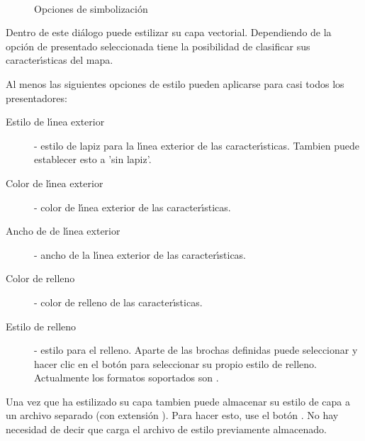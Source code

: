 \begin{figure}[h]
\centering
\caption{Opciones de simbolizaci\'on \nixcaption}
   \goodgap
   \\
   \goodgap
\end{figure}


 \label{sec:style_options} 
Dentro de este di\'alogo puede estilizar su capa vectorial. Dependiendo de la opci\'on de presentado
seleccionada tiene la posibilidad de clasificar sus caracter\'{\i}sticas del mapa.

Al menos las siguientes opciones de estilo pueden aplicarse para casi todos los presentadores:
\begin{description}
 \item[Estilo de l\'{\i}nea exterior] - estilo de lapiz para la l\'{\i}nea exterior de las caracter\'{\i}sticas. Tambien puede establecer
 esto a 'sin lapiz'.
 \item[Color de l\'{\i}nea exterior] - color de l\'{\i}nea exterior de las caracter\'{\i}sticas.
 \item[Ancho de de l\'{\i}nea exterior] - ancho de la l\'{\i}nea exterior de las caracter\'{\i}sticas.
 \item[Color de relleno] - color de relleno de las caracter\'{\i}sticas.
 \item[Estilo de relleno] - estilo para el relleno. Aparte de las brochas definidas puede
 seleccionar  y hacer clic en el bot\'on \browsebutton
 para seleccionar su propio estilo de relleno. Actualmente los formatos soportados son
 .
\end{description}

Una vez que ha estilizado su capa tambien puede almacenar su estilo de capa a
un archivo separado (con extensi\'on ).
Para hacer esto, use el bot\'on . No hay necesidad de decir que
 carga el archivo de estilo previamente almacenado.

